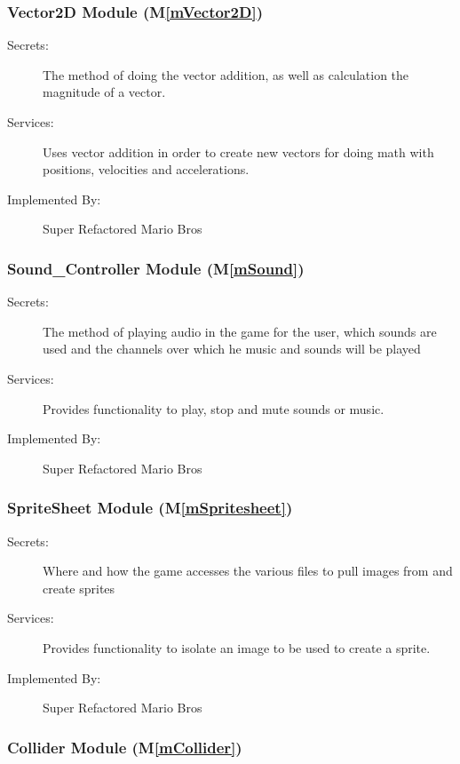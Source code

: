 \documentclass[12pt, titlepage]{article}
\newcommand{\mref}[1]{M\ref{#1}}
\begin{document}
\subsubsection{Vector2D Module (\mref{mVector2D})}

\begin{description}
\item[Secrets:] The method of doing the vector addition, as well as calculation the magnitude of a vector.
\item[Services:] Uses vector addition in order to create new vectors for doing math with positions, velocities and accelerations. 
\item[Implemented By:] Super Refactored Mario Bros
\end{description}

\subsubsection{Sound\_Controller Module (\mref{mSound})}

\begin{description}
\item[Secrets:] The method of playing audio in the game for the user, which sounds are used and the channels over which he music and sounds will be played
\item[Services:] Provides functionality to play, stop and mute sounds or music.
\item[Implemented By:] Super Refactored Mario Bros
\end{description}

\subsubsection{SpriteSheet Module (\mref{mSpritesheet})}

\begin{description}
\item[Secrets:] Where and how the game accesses the various files to pull images from and create sprites
\item[Services:] Provides functionality to isolate an image to be used to create a sprite.
\item[Implemented By:] Super Refactored Mario Bros
\end{description}

\subsubsection{Collider Module (\mref{mCollider})}
\end{document}
